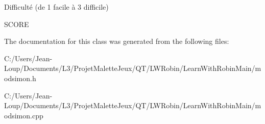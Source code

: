Difficulté (de 1 facile à 3 difficile) 

S\+C\+O\+RE 

The documentation for this class was generated from the following files\+:\begin{DoxyCompactItemize}
\item 
C\+:/\+Users/\+Jean-\/\+Loup/\+Documents/\+L3/\+Projet\+Malette\+Jeux/\+Q\+T/\+L\+W\+Robin/\+Learn\+With\+Robin\+Main/modsimon.\+h\item 
C\+:/\+Users/\+Jean-\/\+Loup/\+Documents/\+L3/\+Projet\+Malette\+Jeux/\+Q\+T/\+L\+W\+Robin/\+Learn\+With\+Robin\+Main/modsimon.\+cpp\end{DoxyCompactItemize}
